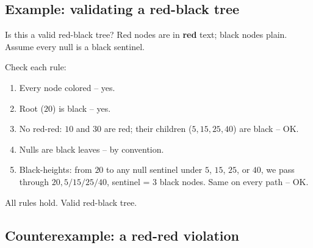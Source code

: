 \documentclass[11pt]{article}
\begin{document}
\subsection*{Example: validating a red-black tree}

Is this a valid red-black tree? Red nodes are in \textbf{red} text; black nodes plain. Assume every null is a black sentinel.

\begin{center}
\end{center}

Check each rule:
\begin{enumerate}[leftmargin=*]
    \item Every node colored -- yes.
    \item Root ($20$) is black -- yes.
    \item No red-red: $10$ and $30$ are red; their children ($5, 15, 25, 40$) are black -- OK.
    \item Nulls are black leaves -- by convention.
    \item Black-heights: from $20$ to any null sentinel under $5$, $15$, $25$, or $40$, we pass through $20, 5/15/25/40$, sentinel = 3 black nodes. Same on every path -- OK.
\end{enumerate}

All rules hold. Valid red-black tree.

\subsection*{Counterexample: a red-red violation}

\begin{center}
\end{center}
\end{document}
